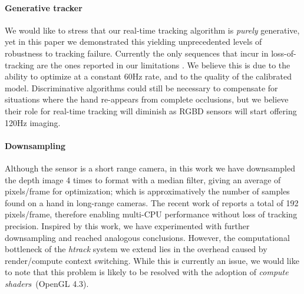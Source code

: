 \paragraph{Generative tracker}
We would like to stress that our real-time tracking algorithm is \emph{purely} generative, yet in this paper we demonstrated this yielding unprecedented levels of robustness to tracking failure. Currently the only sequences that incur in loss-of-tracking are the ones reported in our limitations \VideoLimitations{}. We believe this is due to the ability to optimize at a constant 60Hz rate, and to the quality of the calibrated model. Discriminative algorithms could still be necessary to compensate for situations where the hand re-appears from complete occlusions, but we believe their role for real-time tracking will diminish as RGBD sensors will start offering 120Hz imaging.  

\paragraph{Downsampling}
Although the \realsense{} sensor is a short range camera, in this work we have downsampled the depth image 4 times to  format with a median filter, giving an average of  pixels/frame for optimization; which is approximatively the number of samples found on a hand in long-range cameras. The recent work of \cite{taylor2016concerto} reports a total of 192 pixels/frame, therefore enabling multi-CPU performance without loss of tracking precision. Inspired by this work, we have experimented with further downsampling and reached analogous conclusions. However, the computational bottleneck of the \emph{htrack} system we extend lies in the overhead caused by render/compute context switching. While this is currently an issue, we would like to note that this problem is likely to be resolved with the adoption of \emph{compute shaders}~(OpenGL 4.3).

